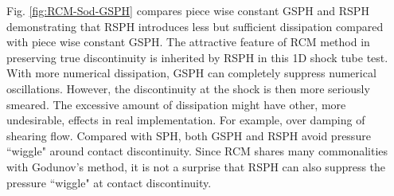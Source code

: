 \documentclass[preprint,12pt,authoryear]{elsarticle}
\begin{document}
Fig. \ref{fig:RCM-Sod-GSPH} compares piece wise constant GSPH and RSPH demonstrating that RSPH introduces less but sufficient dissipation compared with piece wise constant GSPH. The attractive feature of RCM method in preserving true discontinuity is inherited by RSPH in this 1D shock tube test. With more numerical dissipation, GSPH can completely suppress numerical oscillations. However, the discontinuity at the shock is then more seriously smeared. The excessive amount of dissipation might have other, more undesirable, effects in real implementation. For example, over damping of shearing flow. Compared with SPH, both GSPH and RSPH avoid pressure ``wiggle" around contact discontinuity. Since RCM shares many commonalities with Godunov's method, it is not a surprise that RSPH can also suppress the pressure ``wiggle" at contact discontinuity.
\end{document}

